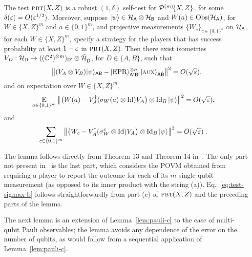 \begin{lemma}\label{lem:pbt}
The test $\textsc{pbt}(X,Z)$ is a robust $(1,\delta)$ self-test 
for $\mathcal{P}^{(m)}\!\{X,Z\}$, for some $\delta(\varepsilon) = O(\varepsilon^{1/2})$. Moreover, suppose $|\psi\rangle\in\mathcal{H}_{\textsf{A}}\otimes \mathcal{H}_{\textsf{B}}$ and $W(a) \in \mathrm{Obs}(\mathcal{H}_{\textsf{A}})$, for $W\in \{X,Z\}^m$ and $a\in\{0,1\}^m$, and projective measurements $\{W_c\}_{c\in \{0,1\}^n}$ on $\mathcal{H}_{\textsf{A}}$, for each $W\in\{X,Z\}^m$, specify a strategy for the players that has success probability at least $1-\varepsilon$ in $\textsc{pbt}(X,Z)$. 
Then there exist isometries $V_D:\mathcal{H}_{\textsf{D}} \to ((\mathbb{C}^2)^{\otimes m})_{{\textsf{D'}}}  \otimes \hat{\mathcal{H}}_{\hat{{\textsf{D}}}}$, for $D\in\{A,B\}$, such that
$$\big\| (V_A \otimes V_B) |\psi\rangle_{{\textsf{AB}}} - |{\rm EPR}\rangle_{{\textsf{A}}'{\textsf{B}}'}^{\otimes n} |\textsc {aux}\rangle_{\hat{{\textsf{A}}}\hat{{\textsf{B}}}} \big\|^2 = O(\sqrt{\varepsilon}),$$
and on expectation over  $W\in \{X,Z\}^m$,
\begin{align}\label{eq:test-sigmax-a}
 \mathop{\textsc{E}}_{a\in\{0,1\}^m} \big\| \big(W(a) -V_A^\dagger (\sigma_W(a) \otimes \mathop{\rm Id}\nolimits) V_A\big) \otimes \mathop{\rm Id}\nolimits_B |\psi\rangle \big\|^2 &= O(\sqrt{\varepsilon}),
\end{align}
and
\begin{align}\label{eq:test-sigmax-b}
 \sum_{c\in\{0,1\}^m} \big\| \big(W_c -V_A^\dagger (\sigma_W^c \otimes \mathop{\rm Id}\nolimits) V_A\big) \otimes \mathop{\rm Id}\nolimits_B |\psi\rangle \big\|^2 &= O(\sqrt{\varepsilon})\;.
\end{align}
\end{lemma}

The lemma follows directly from Theorem 13 and Theorem 14 in~\cite{natarajan2016robust}. The only part not present in~\cite{natarajan2016robust} is the last part, which considers the POVM obtained from requiring a player to report the outcome for each of its $m$ single-qubit measurement (as opposed to its inner product with the string (a)). Eq.~\eqref{eq:test-sigmax-b} follows straightforwardly from part (c) of $\textsc{pbt}(X,Z)$ and the preceding parts of the lemma. 

The next lemma is an extension of Lemma~\ref{lem:pauli-c} to the case of multi-qubit Pauli observables; the lemma avoids any dependence of the error on the number of qubits, as would follow from a sequential application of Lemma~\ref{lem:pauli-c}.

